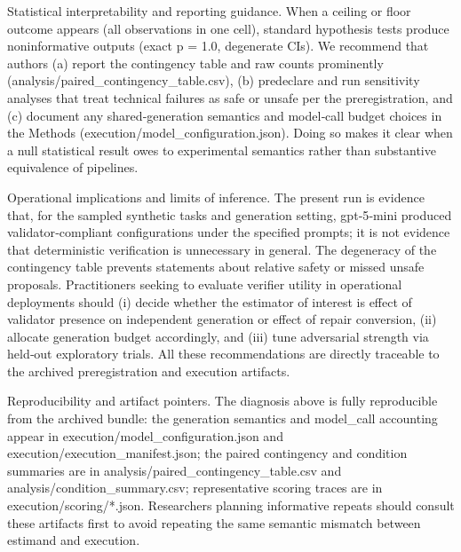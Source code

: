 \documentclass[conference]{IEEEtran}
\begin{document}
Statistical interpretability and reporting guidance. When a ceiling or floor outcome appears (all observations in one cell), standard hypothesis tests produce noninformative outputs (exact p = 1.0, degenerate CIs). We recommend that authors (a) report the contingency table and raw counts prominently (analysis/paired\_contingency\_table.csv), (b) predeclare and run sensitivity analyses that treat technical failures as safe or unsafe per the preregistration, and (c) document any shared‑generation semantics and model‑call budget choices in the Methods (execution/model\_configuration.json). Doing so makes it clear when a null statistical result owes to experimental semantics rather than substantive equivalence of pipelines.

Operational implications and limits of inference. The present run is evidence that, for the sampled synthetic tasks and generation setting, gpt‑5‑mini produced validator‑compliant configurations under the specified prompts; it is not evidence that deterministic verification is unnecessary in general. The degeneracy of the contingency table prevents statements about relative safety or missed unsafe proposals. Practitioners seeking to evaluate verifier utility in operational deployments should (i) decide whether the estimator of interest is effect of validator presence on independent generation or effect of repair conversion, (ii) allocate generation budget accordingly, and (iii) tune adversarial strength via held‑out exploratory trials. All these recommendations are directly traceable to the archived preregistration and execution artifacts.

Reproducibility and artifact pointers. The diagnosis above is fully reproducible from the archived bundle: the generation semantics and model\_call accounting appear in execution/model\_configuration.json and execution/execution\_manifest.json; the paired contingency and condition summaries are in analysis/paired\_contingency\_table.csv and analysis/condition\_summary.csv; representative scoring traces are in execution/scoring/*.json. Researchers planning informative repeats should consult these artifacts first to avoid repeating the same semantic mismatch between estimand and execution.
\end{document}
